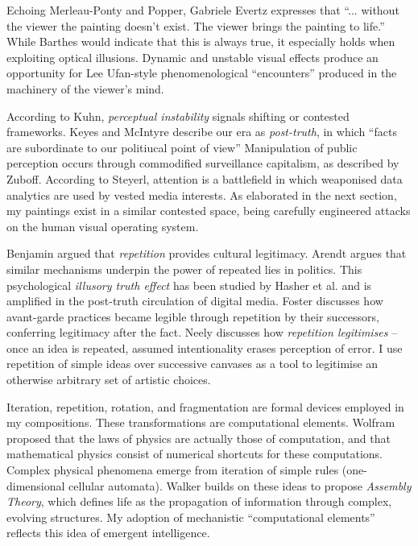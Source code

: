 \documentclass[12pt]{article}
\begin{document}
Echoing Merleau-Ponty\autocite{merleauPonty1962phenomenology} and
Popper,\autocite{popper1972objective} Gabriele Evertz expresses that
``... without the viewer the painting doesn't exist. The viewer brings
the painting to life.''\autocite{evertz09documentary} While Barthes
would indicate that this is always true,\autocite{barthes1977death} it
especially holds when exploiting optical illusions. Dynamic and
unstable visual effects produce an opportunity for Lee Ufan-style
phenomenological ``encounters''\autocite[pp.~52--6]{encounter} produced in
the machinery of the viewer's mind.

According to Kuhn, \emph{perceptual instability} signals shifting or
contested frameworks.\autocite[p.~64]{kuhn1970structure}
Keyes\autocite{keyes2004posttruth} and
McIntyre\autocite{mcintyre2018posttruth} describe our era as
\emph{post-truth}, in which ``facts are subordinate to our politiucal point of view''\autocite[p.~11]{mcintyre2018posttruth} Manipulation of public perception occurs through
commodified surveillance capitalism, as described by
Zuboff.\autocite[pp.~8--12]{zuboff2019surveillance} According to
Steyerl,\autocite{steyerl2016sea} attention is a battlefield in which
weaponised data analytics are used by vested media interests. As
elaborated in the next section, my paintings exist in a similar
contested space, being carefully engineered attacks on the human visual
operating system.

Benjamin argued that \emph{repetition} provides cultural
legitimacy.\autocite{benjamin1935kunstwerk} Arendt argues that similar
mechanisms underpin the power of repeated lies in
politics.\autocite{arendt1972lying} This psychological \emph{illusory
  truth effect} has been studied by Hasher et
al.\autocite{hasher1977frequency} and is amplified in the
post-truth\autocite{keyes2004posttruth,mcintyre2018posttruth} circulation
of digital
media.\autocite{zuboff2019surveillance} Foster\autocite[pp.~29--30]{foster1996return}
discusses how avant-garde practices became legible through repetition
by their successors, conferring legitimacy after the fact. Neely
discusses how \emph{repetition legitimises} -- once an idea is repeated,
assumed intentionality erases perception of
error.\autocite{neely-repetition} I use repetition of simple ideas over
successive canvases as a tool to legitimise an otherwise arbitrary set
of artistic choices.

Iteration, repetition, rotation, and fragmentation are formal devices
employed in my compositions. These transformations are computational
elements. Wolfram proposed that the laws of physics
are actually those of computation, and that mathematical physics
consist of numerical shortcuts for these computations.\autocite{wolfram1984} Complex
physical phenomena emerge from iteration of simple rules
(one-dimensional cellular automata).\autocite{wolfram}
Walker builds on these ideas to propose
\emph{Assembly Theory}, which defines life as the propagation of
information through complex, evolving structures.\autocite{walker2024life} My adoption of
mechanistic ``computational elements'' reflects this idea of
emergent intelligence.
\end{document}
